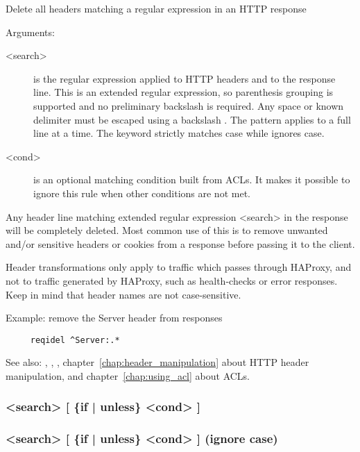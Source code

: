   Delete all headers matching a regular expression in an HTTP response


  Arguments:
  \begin{description}
  \item[<search>] is the regular expression applied to HTTP headers and to the
              response line. This is an extended regular expression, so
              parenthesis grouping is supported and no preliminary backslash
              is required. Any space or known delimiter must be escaped using
              a backslash \chr{\bslash}. The pattern applies to a full line at a time.
              The  keyword strictly matches case while 
              ignores case.

  \item[<cond>] is an optional matching condition built from ACLs. It makes it
              possible to ignore this rule when other conditions are not met.
  \end{description}

  Any header line matching extended regular expression <search> in the response
  will be completely deleted. Most common use of this is to remove unwanted
  and/or sensitive headers or cookies from a response before passing it to the
  client.

  Header transformations only apply to traffic which passes through HAProxy,
  and not to traffic generated by HAProxy, such as health-checks or error
  responses. Keep in mind that header names are not case-sensitive.

  Example: remove the Server header from responses
  \begin{verbatim}
     reqidel ^Server:.*
  \end{verbatim}


See also: , , , chapter~\ref{chap:header_manipulation} about HTTP header
            manipulation, and chapter~\ref{chap:using_acl} about ACLs.

\subsubsection[rspdeny] { <search> [ \{if | unless\} <cond> ]}
\subsubsection[rspideny] { <search> [ \{if | unless\} <cond> ] (ignore case)}

